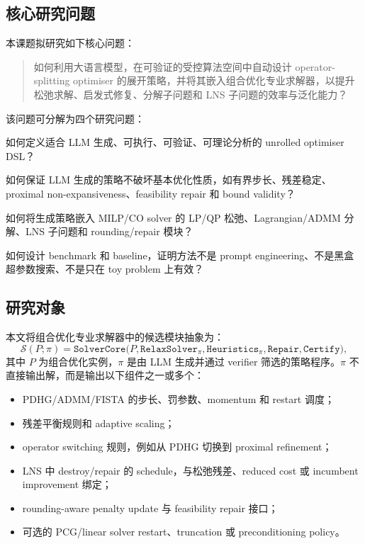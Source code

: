 \documentclass[UTF8,a4paper,12pt,fontset=fandol]{ctexart}
\begin{document}
\subsection{核心研究问题}

本课题拟研究如下核心问题：

\begin{quote}
如何利用大语言模型，在可验证的受控算法空间中自动设计 operator-splitting optimiser 的展开策略，并将其嵌入组合优化专业求解器，以提升松弛求解、启发式修复、分解子问题和 LNS 子问题的效率与泛化能力？
\end{quote}

该问题可分解为四个研究问题：

\begin{description}[leftmargin=2em]
    \item[RQ1：搜索空间] 如何定义适合 LLM 生成、可执行、可验证、可理论分析的 unrolled optimiser DSL？
    \item[RQ2：安全验证] 如何保证 LLM 生成的策略不破坏基本优化性质，如有界步长、残差稳定、proximal non-expansiveness、feasibility repair 和 bound validity？
    \item[RQ3：求解器集成] 如何将生成策略嵌入 MILP/CO solver 的 LP/QP 松弛、Lagrangian/ADMM 分解、LNS 子问题和 rounding/repair 模块？
    \item[RQ4：实验评估] 如何设计 benchmark 和 baseline，证明方法不是 prompt engineering、不是黑盒超参数搜索、不是只在 toy problem 上有效？
\end{description}

\subsection{研究对象}

本文将组合优化专业求解器中的候选模块抽象为：
\begin{equation}
\mathcal{S}(P;\pi) = \texttt{SolverCore}\Big(P, \texttt{RelaxSolver}_{\pi}, \texttt{Heuristics}_{\pi}, \texttt{Repair}, \texttt{Certify}\Big),
\end{equation}
其中 $P$ 为组合优化实例，$\pi$ 是由 LLM 生成并通过 verifier 筛选的策略程序。$\pi$ 不直接输出解，而是输出以下组件之一或多个：
\begin{itemize}[leftmargin=2em]
    \item PDHG/ADMM/FISTA 的步长、罚参数、momentum 和 restart 调度；
    \item 残差平衡规则和 adaptive scaling；
    \item operator switching 规则，例如从 PDHG 切换到 proximal refinement；
    \item LNS 中 destroy/repair 的 schedule，与松弛残差、reduced cost 或 incumbent improvement 绑定；
    \item rounding-aware penalty update 与 feasibility repair 接口；
    \item 可选的 PCG/linear solver restart、truncation 或 preconditioning policy。
\end{itemize}
\end{document}
